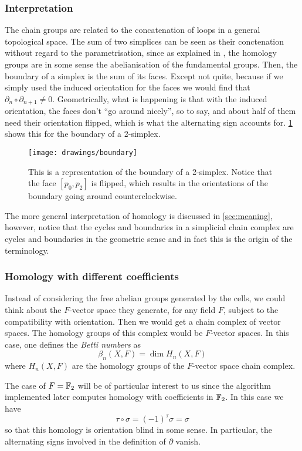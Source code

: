 \documentclass[../main.tex]{subfiles}
\begin{document}
\subsubsection{Interpretation}
The chain groups are related to the concatenation of loops in a general topological space.
The sum of two simplices can be seen as their conctenation without regard to the
parametrisation, since as explained in \cite{hatcher}, the homology groups are in some
sense the abelianisation of the fundamental groups. Then, the boundary of a simplex is the
sum of its faces. Except not quite, because if we simply used the induced orientation for
the faces we would find that \( \partial_{n} \circ \partial_{n+1} \neq 0 \).
Geometrically, what is happening is that with the induced orientation, the faces don't
``go around nicely'', so to say, and about half of them need their orientation flipped,
which is what the alternating sign accounts for. \cref{fig:boundary} shows this for the
boundary of a 2-simplex.
\begin{figure}[htb]
	\centering
	\texttt{[image: drawings/boundary]}
	\caption{This is a representation of the boundary of a 2-simplex. Notice that the face
		\( [p_0, p_2] \) is flipped, which results in the orientations of the boundary going
	around counterclockwise.}
	\label{fig:boundary}
\end{figure}
The more general interpretation of homology is discussed in \cref{sec:meaning}, however,
notice that the cycles and boundaries in a simplicial chain complex are cycles and
boundaries in the geometric sense and in fact this is the origin of the terminology. 

\subsubsection{Homology with different coefficients} \label{sec:different coefficients}
Instead of considering the free abelian groups generated by the cells, we could think
about the \( F \)-vector space they generate, for any field \( F \), subject to the
compatibility with orientation. Then we would get a chain complex of vector spaces. The
homology groups of this complex would be \( F \)-vector spaces. In this case, one defines
the \emph{Betti numbers} as
\begin{equation*}
	\beta_n(X, F) = \dim H_n(X, F)
\end{equation*}
where \( H_n(X, F) \) are the homology groups of the \( F \)-vector space chain
complex. 

The case of \( F = \mathbb{F}_2 \) will be of particular interest to us since the algorithm
implemented later computes homology with coefficients in \( \mathbb{F}_2 \). In this case we have
\begin{equation*}
	\tau \circ \sigma = (-1)^\tau \sigma = \sigma
\end{equation*}
so that this homology is orientation blind in some sense. In particular, the alternating
signs involved in the definition of \( \partial \) vanish. 
\end{document}
